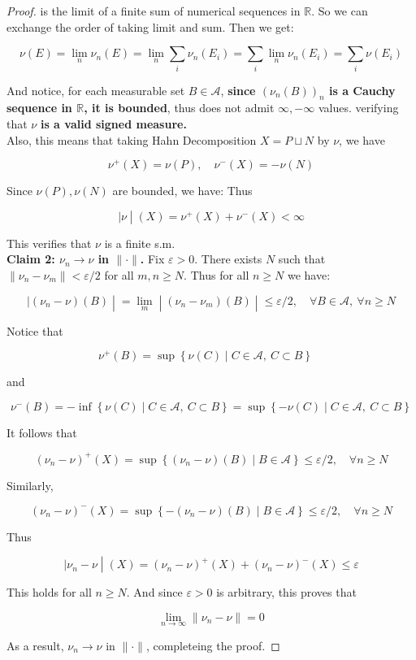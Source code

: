 \documentclass{qlnotes-export}
\begin{document}
\begin{proof}
is the limit of a finite sum of numerical sequences in \(\mathbb{R}\). So we can exchange the order of taking limit and sum. Then we get:

\[\nu(E) = \lim\limits_{n}\nu_{n}(E) = \lim\limits_{n}\sum\limits_{i}\nu_{n}(E_{i}) = \sum\limits_{i}\lim\limits_{n}\nu_{n}(E_{i}) = \sum\limits_{i}\nu(E_{i})\]

And notice, for each measurable set \(B \in \mathcal{A}\), \textbf{since \((\nu_{n}(B))_{n}\) is a Cauchy sequence in \(\mathbb{R}\), it is bounded}, thus does not admit \(\infty, - \infty\) values. verifying that \(\nu\) \textbf{is a valid signed measure.}\\
Also, this means that taking Hahn Decomposition \(X = P \sqcup N\) by \(\nu\), we have

\[\nu^{+}(X) = \nu(P),\quad\nu^{-}(X) = - \nu(N)\]

Since \(\nu(P),\nu(N)\) are bounded, we have: Thus

\[\left. |\nu \middle| (X) = \nu^{+}(X) + \nu^{-}(X) < \infty \right.\]

This verifies that \(\nu\) is a finite s.m.\\
\textbf{Claim 2: \(\nu_{n}\rightarrow\nu\) in \(\parallel \cdot \parallel\).} Fix \(\varepsilon > 0\). There exists \(N\) such that \(\parallel \nu_{n} - \nu_{m} \parallel < \varepsilon/2\) for all \(m,n \geq N\). Thus for all \(n \geq N\) we have:

\[\left. |(\nu_{n} - \nu)(B) \middle| = \lim\limits_{m} \middle| (\nu_{n} - \nu_{m})(B) \middle| \leq \varepsilon/2,\quad\forall B \in \mathcal{A},\ \forall n \geq N \right.\]

Notice that

\[\nu^{+}(B) = \sup\left\{ {\nu(C) \mid C \in \mathcal{A},\ C \subset B} \right\}\quad\]

and

\[\nu^{-}(B) = - \inf\left\{ {\nu(C) \mid C \in \mathcal{A},\ C \subset B} \right\} = \sup\left\{ {- \nu(C) \mid C \in \mathcal{A},\ C \subset B} \right\}\]

It follows that

\[(\nu_{n} - \nu)^{+}(X) = \sup\left\{ {(\nu_{n} - \nu)(B) \mid B \in \mathcal{A}} \right\} \leq \varepsilon/2,\quad\forall n \geq N\]

Similarly,

\[(\nu_{n} - \nu)^{-}(X) = \sup\left\{ {- (\nu_{n} - \nu)(B) \mid B \in \mathcal{A}} \right\} \leq \varepsilon/2,\quad\forall n \geq N\]

Thus

\[\left. |\nu_{n} - \nu \middle| (X) = (\nu_{n} - \nu)^{+}(X) + (\nu_{n} - \nu)^{-}(X) \leq \varepsilon \right.\]

This holds for all \(n \geq N\). And since \(\varepsilon > 0\) is arbitrary, this proves that

\[\lim\limits_{n\rightarrow\infty} \parallel \nu_{n} - \nu \parallel = 0\]

As a result, \(\nu_{n}\rightarrow\nu\) in \(\parallel \cdot \parallel\), completeing the proof.

\end{proof}
\end{document}
